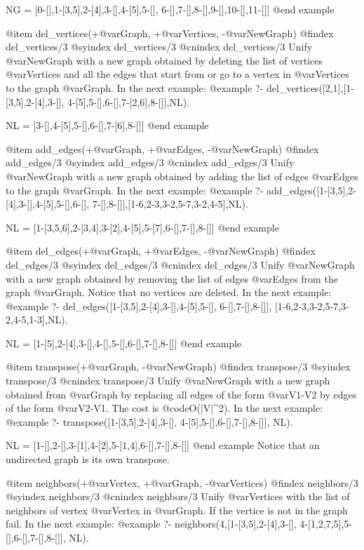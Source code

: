 {{{{{{{{{NG = [0-[],1-[3,5],2-[4],3-[],4-[5],5-[],
      6-[],7-[],8-[],9-[],10-[],11-[]]
@end example

@item del_vertices(+@var{Graph}, +@var{Vertices}, -@var{NewGraph})
@findex  del_vertices/3
@syindex del_vertices/3
@cnindex del_vertices/3
Unify @var{NewGraph} with a new graph obtained by deleting the list of
vertices @var{Vertices} and all the edges that start from or go to a
vertex in @var{Vertices} to the graph @var{Graph}. In the next example:
@example
?- del_vertices([2,1],[1-[3,5],2-[4],3-[],
                 4-[5],5-[],6-[],7-[2,6],8-[]],NL).

NL = [3-[],4-[5],5-[],6-[],7-[6],8-[]]
@end example

@item add_edges(+@var{Graph}, +@var{Edges}, -@var{NewGraph})
@findex  add_edges/3
@syindex add_edges/3
@cnindex add_edges/3
Unify @var{NewGraph} with a new graph obtained by adding the list of
edges @var{Edges} to the graph @var{Graph}. In the next example:
@example
?- add_edges([1-[3,5],2-[4],3-[],4-[5],5-[],6-[],
              7-[],8-[]],[1-6,2-3,3-2,5-7,3-2,4-5],NL).

NL = [1-[3,5,6],2-[3,4],3-[2],4-[5],5-[7],6-[],7-[],8-[]]
@end example

@item del_edges(+@var{Graph}, +@var{Edges}, -@var{NewGraph})
@findex  del_edges/3
@syindex del_edges/3
@cnindex del_edges/3
Unify @var{NewGraph} with a new graph obtained by removing the list of
edges @var{Edges} from the graph @var{Graph}. Notice that no vertices
are deleted. In the next example:
@example
?- del_edges([1-[3,5],2-[4],3-[],4-[5],5-[],
              6-[],7-[],8-[]],
             [1-6,2-3,3-2,5-7,3-2,4-5,1-3],NL).

NL = [1-[5],2-[4],3-[],4-[],5-[],6-[],7-[],8-[]]
@end example

@item transpose(+@var{Graph}, -@var{NewGraph})
@findex  transpose/3
@syindex transpose/3
@cnindex transpose/3
Unify @var{NewGraph} with a new graph obtained from @var{Graph} by
replacing all edges of the form @var{V1-V2} by edges of the form
@var{V2-V1}. The cost is @code{O(|V|^2)}. In the next example:
@example
?- transpose([1-[3,5],2-[4],3-[],
              4-[5],5-[],6-[],7-[],8-[]], NL).

NL = [1-[],2-[],3-[1],4-[2],5-[1,4],6-[],7-[],8-[]]
@end example
Notice that an undirected graph is its own transpose.

@item neighbors(+@var{Vertex}, +@var{Graph}, -@var{Vertices})
@findex  neighbors/3
@syindex neighbors/3
@cnindex neighbors/3
Unify @var{Vertices} with the list of neighbors of vertex @var{Vertex}
in @var{Graph}. If the vertice is not in the graph fail. In the next
example:
@example
?- neighbors(4,[1-[3,5],2-[4],3-[],
                4-[1,2,7,5],5-[],6-[],7-[],8-[]],
             NL).

}}}}}}}}}
